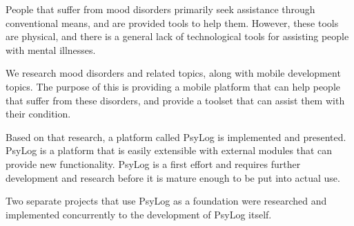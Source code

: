 People that suffer from mood disorders primarily seek assistance through conventional means, and are provided tools to help them.
However, these tools are physical, and there is a general lack of technological tools for assisting people with mental illnesses.

We research mood disorders and related topics, along with mobile development topics.
The purpose of this is providing a mobile platform that can help people that suffer from these disorders, and provide a toolset that can assist them with their condition.

Based on that research, a platform called PsyLog is implemented and presented.
PsyLog is a platform that is easily extensible with external modules that can provide new functionality.
PsyLog is a first effort and requires further development and research before it is mature enough to be put into actual use.

Two separate projects that use PsyLog as a foundation were researched and implemented concurrently to the development of PsyLog itself. 
